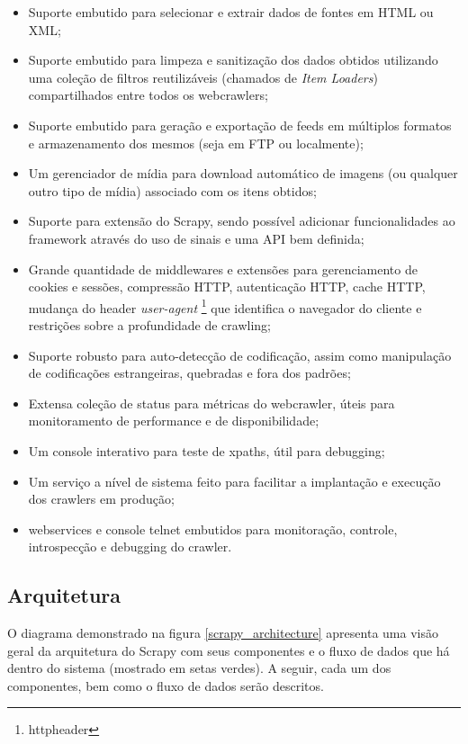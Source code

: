 \begin{itemize}
	\item Suporte embutido para selecionar e extrair dados de fontes em HTML ou XML;
	\item Suporte embutido para limpeza e sanitização dos dados obtidos utilizando uma coleção de filtros reutilizáveis (chamados de \emph{Item Loaders}) compartilhados entre todos os \glspl{webcrawler};
	\item Suporte embutido para geração e exportação de \glspl{feed} em múltiplos formatos e armazenamento dos mesmos (seja em FTP ou localmente);
	\item Um gerenciador de mídia para download automático de imagens (ou qualquer outro tipo de mídia) associado com os itens obtidos;
	\item Suporte para extensão do Scrapy, sendo possível adicionar funcionalidades ao framework através do uso de sinais e uma API bem definida;
	\item Grande quantidade de \glspl{middleware} e extensões para gerenciamento de cookies e sessões, compressão HTTP, autenticação HTTP, cache HTTP, mudança do header \emph{user-agent} \footnote{\Gls{httpheader}} que identifica o navegador do cliente e restrições sobre a profundidade de \gls{crawling};
	\item Suporte robusto para auto-detecção de codificação, assim como manipulação de codificações estrangeiras, quebradas e fora dos padrões;
	\item Extensa coleção de status para métricas do \gls{webcrawler}, úteis para monitoramento de performance e de disponibilidade;
	\item Um console interativo para teste de \glspl{xpath}, útil para \gls{debugging};
	\item Um serviço a nível de sistema feito para facilitar a implantação e execução dos crawlers em produção;
	\item \Glspl{webservice} e console telnet embutidos para monitoração, controle, introspecção e \gls{debugging} do crawler.
\end{itemize}

\subsection{Arquitetura}

O diagrama demonstrado na figura \ref{scrapy_architecture} apresenta uma visão geral da arquitetura do Scrapy com seus componentes e o fluxo de dados que há dentro do sistema (mostrado em setas verdes). A seguir, cada um dos componentes, bem como o fluxo de dados serão descritos.

